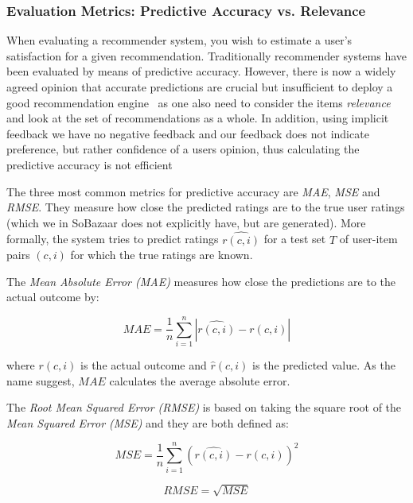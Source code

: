\subsubsection{Evaluation Metrics: Predictive Accuracy vs. Relevance}
When evaluating a recommender system, you wish to estimate a user's
satisfaction for a given recommendation. Traditionally recommender systems have
been evaluated by means of predictive accuracy. However, there is now a widely
agreed opinion that accurate predictions are crucial but insufficient to deploy
a good recommendation engine~\cite{Shani2011, McNee2006} as one also need to
consider the items \textit{relevance} and look at the set of recommendations as
a whole.  In addition, using implicit feedback we have no negative feedback and
our feedback does not indicate preference, but rather confidence of a users
opinion, thus calculating the predictive accuracy is not
efficient~\cite{Hu2008}

The three most common metrics for predictive accuracy are \textit{MAE},
\textit{MSE} and \textit{RMSE}. They measure how close the predicted ratings
are to the true user ratings (which we in SoBazaar does not explicitly have,
but are generated). More formally, the system tries to predict ratings
$\hat{r(c,i)}$ for a test set $T$ of user-item pairs $(c, i)$ for which the
true ratings are known.

The \textit{Mean Absolute Error (MAE)} measures how close the predictions are
to the actual outcome by:

\begin{equation}
    MAE = \frac{1}{n}\sum_{i=1}^{n}{|\hat{r(c,i)}-r(c,i)|}
    \label{equation:mae}
\end{equation}

where $r(c,i)$ is the actual outcome and $\hat{r}(c,i)$ is the predicted
value. As the name suggest, $MAE$ calculates the average absolute error.

The \textit{Root Mean Squared Error (RMSE)} is based on taking the square root
of the \textit{Mean Squared Error (MSE)} and they are both defined as:

\begin{equation}
    MSE = \frac{1}{n}\sum_{i=1}^{n}{(\hat{r(c,i)} - r(c,i))^{2}}
    \label{equation:mse}
\end{equation}

\begin{equation}
    RMSE = \sqrt{MSE}
    \label{equation:rmse}
\end{equation}


